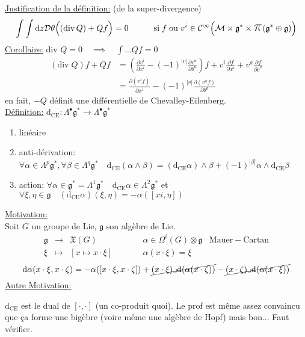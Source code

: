\documentclass[a4paper,11pt]{article}
\renewcommand{\d}{{\mathrm{d}}}
\newcommand{\D}{{\mathcal{D}}}
\newcommand{\dr}[2]{\frac{\partial {#1}}{\partial{#2}}}
\newcommand{\ppi}{{\mathlarger{\mathlarger{\mathlarger{\pi}}}}}
\begin{document}
\noindent\underline{Justification de la définition:} (de la super-divergence)
$$\int\int \d z\D\theta \Big((\mathrm{div}\,Q) +Qf\Big)=0\quad \quad \quad \mathrm{si}\; f\;\mathrm{ou}\; v^i \in \mathcal{C}^\infty\Big(\mathcal M\times\mathfrak g^*\times\ppi(\mathfrak g^*\oplus\mathfrak g)\Big)$$
\underline{Corollaire:} \quad \quad div $Q=0 \quad\implies \quad \int ... Qf = 0$
\begin{align*}
(\mathrm{div}\;Q)f + Qf &= \left(\dr{v^i}{x^i}-(-1)^{|v|}\dr{v^a}{\theta^a}\right) f + v^i\dr f{x^i} + v^a\dr f {\bar c^a}\\
&=\dr{(v^if)}{x^i} - (-1)^{|v|}\dr{(v^af)}{\theta^a}
\end{align*}
en fait, $-Q$ définit une différentielle de Chevalley-Eilenberg.\\

\noindent\underline{Définition:} \quad $\d_\mathrm{CE}: \Lambda^\bullet\mathfrak g^* \longrightarrow \Lambda^\bullet\mathfrak{g}^*$
\begin{enumerate}
\item linéaire
\item anti-dérivation: $\forall\alpha\in\Lambda^p\mathfrak{g}^*,\forall\beta\in\Lambda^q\mathfrak{g}^*\quad\d_\mathrm{CE}(\alpha\wedge\beta) = (\d_\mathrm{CE}\alpha)\wedge\beta + (-1)^{|\beta|}\alpha\wedge\d_\mathrm{CE}\beta$
\item action: $\forall\alpha\in\mathfrak{g}^*=\Lambda^1\mathfrak{g}^* \quad \d_\mathrm{CE}\alpha\in\Lambda^2\mathfrak{g}^*$ et $\forall\xi,\eta\in\mathfrak{g}\quad (\d_\mathrm{CE}\alpha)(\xi,\eta) = - \alpha([xi,\eta])$
\end{enumerate}

\noindent\underline{Motivation:}\\
Soit $G$ un groupe de Lie, $\mathfrak{g}$ son algèbre de Lie.
$$\begin{matrix}
\mathfrak{g} & \to & \mathfrak{X}(G)&
\quad \quad&
\alpha\in\Omega^i(G)\otimes\mathfrak{g} &\mathrm{Mauer}-\mathrm{Cartan}\\
\xi & \mapsto & [x\mapsto x\cdot\xi]&&
\alpha(x\cdot\xi)=\xi
\end{matrix}$$
$$
\d \alpha (x\cdot\xi,x\cdot\zeta) = 
-\alpha([x\cdot\xi,x\cdot\zeta]) +
\cancel{(x\cdot\xi)\lrcorner\d(\alpha(x\cdot\zeta))} -
\cancel{(x\cdot\zeta)\lrcorner\d(\alpha(x\cdot\xi))}
$$
\underline{Autre Motivation:}

$\d_\mathrm{CE}$ est le dual de $[\cdot,\cdot]$ (un co-produit quoi). Le prof est même assez convaincu que ça forme une bigèbre (voire même une algèbre de Hopf) mais bon... Faut vérifier.
\end{document}
